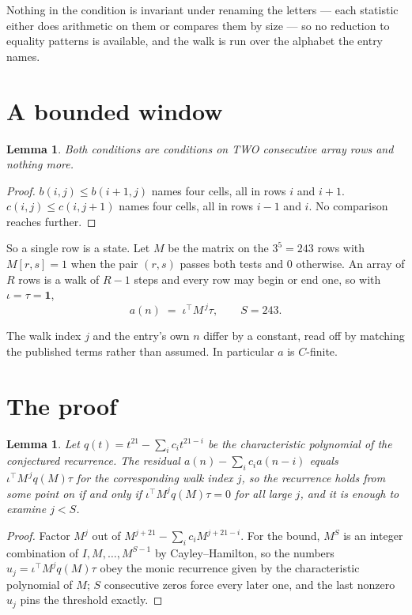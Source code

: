 \documentclass[11pt,a4paper]{article}
\theoremstyle{plain}
\newtheorem{lemma}[theorem]{Lemma}
\theoremstyle{definition}
\begin{document}
Nothing in the condition is invariant under renaming the letters --- each statistic either does
arithmetic on them or compares them by size --- so no reduction to equality patterns is
available, and the walk is run over the alphabet the entry names.

\section{A bounded window}

\begin{lemma}\label{lem:win}
Both conditions are conditions on TWO consecutive array rows and nothing more.
\end{lemma}

\begin{proof}
$b(i,j)\le b(i{+}1,j)$ names four cells, all in rows $i$ and $i+1$. $c(i,j)\le c(i,j{+}1)$
names four cells, all in rows $i-1$ and $i$. No comparison reaches further.
\end{proof}

So a single row is a state. Let $M$ be the matrix on the $3^{5}=243$ rows with
$M[r,s]=1$ when the pair $(r,s)$ passes both tests and $0$ otherwise. An array of $R$ rows is a
walk of $R-1$ steps and every row may begin or end one, so with $\iota=\tau=\mathbf{1}$,
\[
a(n)\;=\;\iota^{\!\top}M^{\,j}\tau ,\qquad S=243.
\]

The walk index $j$ and the entry's own $n$ differ by a constant, read off by matching the
published terms rather than assumed. In particular $a$ is $C$-finite.

\section{The proof}

\begin{lemma}\label{lem:crit}
Let $q(t)=t^{21}-\sum_i c_it^{21-i}$ be the characteristic polynomial of the
conjectured recurrence. The residual $a(n)-\sum_ic_ia(n-i)$ equals
$\iota^{\!\top}M^{\,j}q(M)\tau$ for the corresponding walk index $j$, so the recurrence
holds from some point on if and only if $\iota^{\!\top}M^{j}q(M)\tau=0$ for all large $j$,
and it is enough to examine $j<S$.
\end{lemma}

\begin{proof}
Factor $M^{j}$ out of $M^{j+21}-\sum_ic_iM^{j+21-i}$. For the bound, $M^{S}$
is an integer combination of $I,M,\dots,M^{S-1}$ by Cayley--Hamilton, so the numbers
$u_j=\iota^{\!\top}M^{j}q(M)\tau$ obey the monic recurrence given by the characteristic
polynomial of $M$; $S$ consecutive zeros force every later one, and the last nonzero $u_j$
pins the threshold exactly.
\end{proof}
\end{document}
